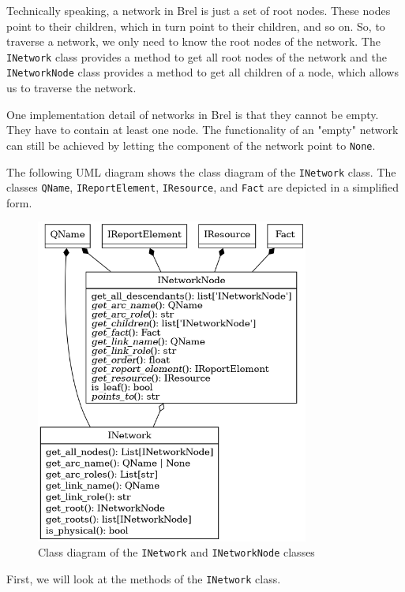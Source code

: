 Technically speaking, a network in Brel is just a set of root nodes.
These nodes point to their children, which in turn point to their children, and so on.
So, to traverse a network, we only need to know the root nodes of the network.
The \texttt{INetwork} class provides a method to get all root nodes of the network
and the \texttt{INetworkNode} class provides a method to get all children of a node,
which allows us to traverse the network.

One implementation detail of networks in Brel is that they cannot be empty.
They have to contain at least one node.
The functionality of an "empty" network can still be achieved by letting the component of the network point to \texttt{None}.

The following UML diagram shows the class diagram of the \texttt{INetwork} class. 
The classes \texttt{QName}, \texttt{IReportElement}, \texttt{IResource}, and \texttt{Fact} are depicted in a simplified form.

\begin{figure}[H]
    \caption{Class diagram of the \texttt{INetwork} and \texttt{INetworkNode} classes}
    \label{fig:inetwork_class_diagram}
    \includegraphics[width=0.8\textwidth]{images/i_networks_uml.png}
\end{figure}

First, we will look at the methods of the \texttt{INetwork} class.

